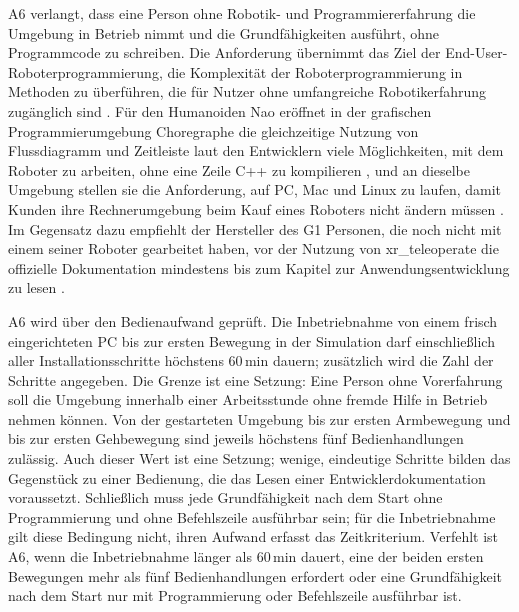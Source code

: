 A6 verlangt, dass eine Person ohne Robotik- und Programmiererfahrung die Umgebung in Betrieb nimmt und die Grundfähigkeiten ausführt, ohne Programmcode zu schreiben.
Die Anforderung übernimmt das Ziel der End-User-Roboterprogrammierung, die Komplexität der Roboterprogrammierung in Methoden zu überführen, die für Nutzer ohne umfangreiche Robotikerfahrung zugänglich sind \cite{Ajaykumar2021}.
Für den Humanoiden Nao eröffnet in der grafischen Programmierumgebung Choregraphe die gleichzeitige Nutzung von Flussdiagramm und Zeitleiste laut den Entwicklern viele Möglichkeiten, mit dem Roboter zu arbeiten, ohne eine Zeile C++ zu kompilieren \cite{Pot2009}, und an dieselbe Umgebung stellen sie die Anforderung, auf PC, Mac und Linux zu laufen, damit Kunden ihre Rechnerumgebung beim Kauf eines Roboters nicht ändern müssen \cite{Pot2009}.
Im Gegensatz dazu empfiehlt der Hersteller des G1 Personen, die noch nicht mit einem seiner Roboter gearbeitet haben, vor der Nutzung von xr\_teleoperate die offizielle Dokumentation mindestens bis zum Kapitel zur Anwendungsentwicklung zu lesen \cite{UnitreeXRTeleop}.

A6 wird über den Bedienaufwand geprüft.
Die Inbetriebnahme von einem frisch eingerichteten PC bis zur ersten Bewegung in der Simulation darf einschließlich aller Installationsschritte höchstens 60\,min dauern; zusätzlich wird die Zahl der Schritte angegeben. %
Die Grenze ist eine Setzung: Eine Person ohne Vorerfahrung soll die Umgebung innerhalb einer Arbeitsstunde ohne fremde Hilfe in Betrieb nehmen können.
Von der gestarteten Umgebung bis zur ersten Armbewegung und bis zur ersten Gehbewegung sind jeweils höchstens fünf Bedienhandlungen zulässig. %
Auch dieser Wert ist eine Setzung; wenige, eindeutige Schritte bilden das Gegenstück zu einer Bedienung, die das Lesen einer Entwicklerdokumentation voraussetzt.
Schließlich muss jede Grundfähigkeit nach dem Start ohne Programmierung und ohne Befehlszeile ausführbar sein; für die Inbetriebnahme gilt diese Bedingung nicht, ihren Aufwand erfasst das Zeitkriterium. %
Verfehlt ist A6, wenn die Inbetriebnahme länger als 60\,min dauert, eine der beiden ersten Bewegungen mehr als fünf Bedienhandlungen erfordert oder eine Grundfähigkeit nach dem Start nur mit Programmierung oder Befehlszeile ausführbar ist.

